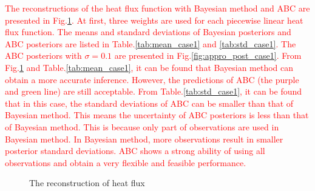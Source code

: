 \documentclass[review]{elsarticle}
\begin{document}
\textcolor{red}{The reconstructions of the heat flux function with Bayesian method and ABC are presented in Fig.\ref{fig:resultofflux}. At first, three weights are used for each piecewise linear heat flux function. The means and standard deviations of Bayesian posteriors and ABC posteriors are listed in Table.\ref{tab:mean_case1} and \ref{tab:std_case1}. The ABC posteriors with $\sigma=0.1$ are presented in Fig.\ref{fig:appro_post_case1}. From Fig.\ref{fig:resultofflux} and Table.\ref{tab:mean_case1}, it can be found that Bayesian method can obtain a more accurate inference. However, the predictions of ABC (the purple and green line) are still acceptable. From Table.\ref{tab:std_case1}, it can be found that in this case, the standard deviations of ABC can be smaller than that of Bayesian method. This means the uncertainty \cite{doltsinis2001ordinary} of ABC posteriors is less than that of Bayesian method. This is because only part of observations are used in Bayesian method. In Bayesian method, more observations result in smaller posterior standard deviations. ABC shows a strong ability of using all observations and obtain a very flexible and feasible performance.}

\begin{figure}
    \centering
    \centering
    \caption{The reconstruction of heat flux}
    \label{fig:resultofflux}
\end{figure}
\end{document}
